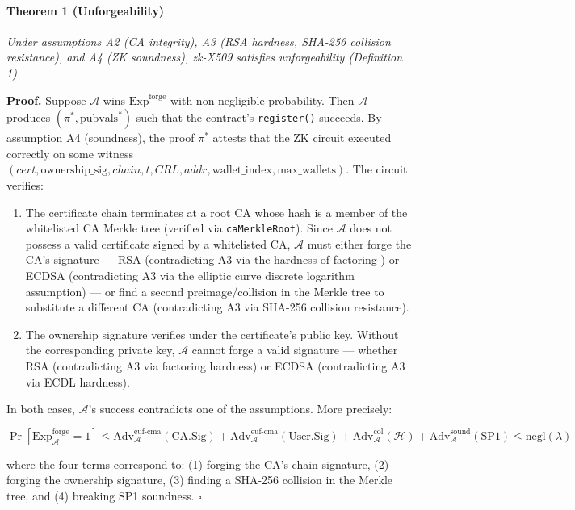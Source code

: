 \documentclass[11pt, a4paper]{article}
\begin{document}
\paragraph{Theorem 1 (Unforgeability)}\label{theorem-1-unforgeability}

\emph{Under assumptions A2 (CA integrity), A3 (RSA hardness, SHA-256
collision resistance), and A4 (ZK soundness), zk-X509 satisfies
unforgeability (Definition 1).}

\textbf{Proof.} Suppose \(\mathcal{A}\) wins
\(\text{Exp}^{\text{forge}}\) with non-negligible probability. Then
\(\mathcal{A}\) produces \((\pi^*, \text{pubvals}^*)\) such that the
contract's \texttt{register()} succeeds. By assumption A4 (soundness),
the proof \(\pi^*\) attests that the ZK circuit executed correctly on
some witness
\((cert, \text{ownership\_sig}, chain, t, CRL, addr, \text{wallet\_index}, \text{max\_wallets})\).
The circuit verifies:

\begin{enumerate}
\def\labelenumi{(\alph{enumi})}
\item
  The certificate chain terminates at a root CA whose hash is a member
  of the whitelisted CA Merkle tree (verified via
  \texttt{caMerkleRoot}). Since \(\mathcal{A}\) does not possess a valid
  certificate signed by a whitelisted CA, \(\mathcal{A}\) must either
  forge the CA's signature --- RSA (contradicting A3 via the hardness of
  factoring \cite{ref12}) or ECDSA (contradicting A3 via the elliptic curve
  discrete logarithm assumption) --- or find a second preimage/collision
  in the Merkle tree to substitute a different CA (contradicting A3 via
  SHA-256 collision resistance).
\item
  The ownership signature verifies under the certificate's public key.
  Without the corresponding private key, \(\mathcal{A}\) cannot forge a
  valid signature --- whether RSA (contradicting A3 via factoring
  hardness) or ECDSA (contradicting A3 via ECDL hardness).
\end{enumerate}

In both cases, \(\mathcal{A}\)'s success contradicts one of the
assumptions. More precisely:

\[\Pr[\text{Exp}_{\mathcal{A}}^{\text{forge}} = 1] \leq \text{Adv}_{\mathcal{A}}^{\text{euf-cma}}(\text{CA.Sig}) + \text{Adv}_{\mathcal{A}}^{\text{euf-cma}}(\text{User.Sig}) + \text{Adv}_{\mathcal{A}}^{\text{col}}(\mathcal{H}) + \text{Adv}_{\mathcal{A}}^{\text{sound}}(\text{SP1}) \leq \text{negl}(\lambda)\]

where the four terms correspond to: (1) forging the CA's chain
signature, (2) forging the ownership signature, (3) finding a SHA-256
collision in the Merkle tree, and (4) breaking SP1 soundness.
\(\square\)
\end{document}
